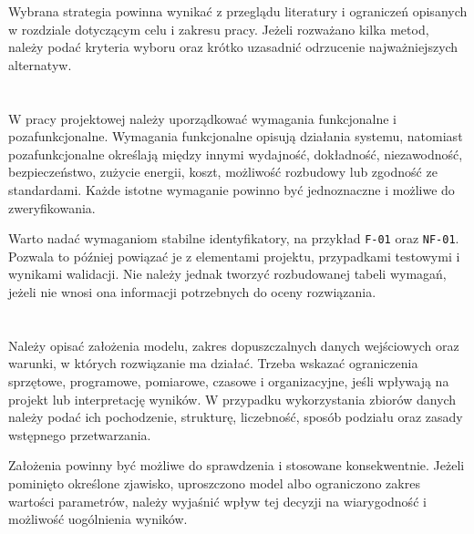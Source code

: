 Wybrana strategia powinna wynikać z przeglądu literatury i ograniczeń opisanych w rozdziale dotyczącym celu i zakresu pracy. Jeżeli rozważano kilka metod, należy podać kryteria wyboru oraz krótko uzasadnić odrzucenie najważniejszych alternatyw.

\section{}

W pracy projektowej należy uporządkować wymagania funkcjonalne i pozafunkcjonalne. Wymagania funkcjonalne opisują działania systemu, natomiast pozafunkcjonalne określają między innymi wydajność, dokładność, niezawodność, bezpieczeństwo, zużycie energii, koszt, możliwość rozbudowy lub zgodność ze standardami. Każde istotne wymaganie powinno być jednoznaczne i możliwe do zweryfikowania.

Warto nadać wymaganiom stabilne identyfikatory, na przykład \texttt{F-01} oraz \texttt{NF-01}. Pozwala to później powiązać je z elementami projektu, przypadkami testowymi i wynikami walidacji. Nie należy jednak tworzyć rozbudowanej tabeli wymagań, jeżeli nie wnosi ona informacji potrzebnych do oceny rozwiązania.

\section{}

Należy opisać założenia modelu, zakres dopuszczalnych danych wejściowych oraz warunki, w których rozwiązanie ma działać. Trzeba wskazać ograniczenia sprzętowe, programowe, pomiarowe, czasowe i organizacyjne, jeśli wpływają na projekt lub interpretację wyników. W przypadku wykorzystania zbiorów danych należy podać ich pochodzenie, strukturę, liczebność, sposób podziału oraz zasady wstępnego przetwarzania.

Założenia powinny być możliwe do sprawdzenia i stosowane konsekwentnie. Jeżeli pominięto określone zjawisko, uproszczono model albo ograniczono zakres wartości parametrów, należy wyjaśnić wpływ tej decyzji na wiarygodność i możliwość uogólnienia wyników.

\section{}

